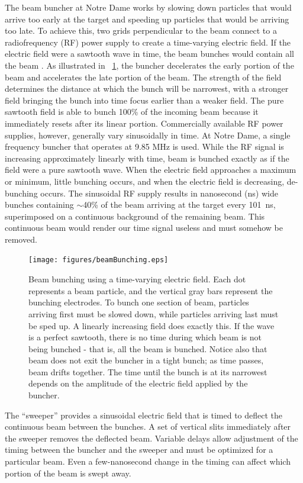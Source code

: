 The beam buncher at Notre Dame works by slowing down particles that would arrive too early at the target and speeding up particles that would be arriving too late.  To achieve this, two grids perpendicular to the beam connect to a radiofrequency (RF) power supply to create a time-varying electric field.  If the electric field were a sawtooth wave in time, the beam bunches would contain all the beam \cite{LynchBunching}.  As illustrated in {\fig}~\ref{fig:bunching}, the buncher decelerates the early portion of the beam and accelerates the late portion of the beam.  The strength of the field determines the distance at which the bunch will be narrowest, with a stronger field bringing the bunch into time focus earlier than a weaker field.  The pure sawtooth field is able to bunch 100\% of the incoming beam because it immediately resets after its linear portion.  Commercially available RF power supplies, however, generally vary sinusoidally in time.  At Notre Dame, a single frequency buncher that operates at 9.85 MHz is used.  While the RF signal is increasing approximately linearly with time, beam is bunched exactly as if the field were a pure sawtooth wave.  When the electric field approaches a maximum or minimum, little bunching occurs, and when the electric field is decreasing, de-bunching occurs.  The sinusoidal RF supply results in nanosecond (ns) wide bunches containing $\sim$40\% of the beam arriving at the target every 101~ns, superimposed on a continuous background of the remaining beam.  This continuous beam would render our time signal useless and must somehow be removed.

\begin{figure}[htp]
\centering
\texttt{[image: figures/beamBunching.eps]}
\caption{Beam bunching using a time-varying electric field.  Each dot represents a beam particle, and the vertical gray bars represent the bunching electrodes.  To bunch one section of beam, particles arriving first must be slowed down, while particles arriving last must be sped up.  A linearly increasing field does exactly this.  If the wave is a perfect sawtooth, there is no time during which beam is not being bunched - that is, all the beam is bunched.  Notice also that beam does not exit the buncher in a tight bunch; as time passes, beam drifts together.  The time until the bunch is at its narrowest depends on the amplitude of the electric field applied by the buncher.}
\label{fig:bunching}
\end{figure}

The ``sweeper'' provides a sinusoidal electric field that is timed to deflect the continuous beam between the bunches.  A set of vertical slits immediately after the sweeper removes the deflected beam.  Variable delays allow adjustment of the timing between the buncher and the sweeper and must be optimized for a particular beam.  Even a few-nanosecond change in the timing can affect which portion of the beam is swept away. 

